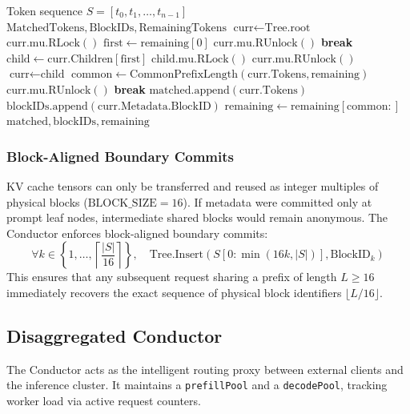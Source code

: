 \documentclass[10pt,twocolumn,letterpaper]{article}
\begin{document}
\begin{algorithm}[t]
\caption{Lock-Coupled MatchPrefix}
\label{alg:lock_coupling}
\begin{algorithmic}[1]
\Require Token sequence $S = [t_0, t_1, \dots, t_{n-1}]$
\Ensure $\text{MatchedTokens}, \text{BlockIDs}, \text{RemainingTokens}$
\State $\text{curr} \gets \text{Tree.root}$
\State $\text{curr.mu.RLock}()$
    \State $\text{first} \gets \text{remaining}[0]$
        \State $\text{curr.mu.RUnlock}()$
        \State \textbf{break}
    \EndIf
    \State $\text{child} \gets \text{curr.Children}[\text{first}]$
    \State $\text{child.mu.RLock}()$ 
    \State $\text{curr.mu.RUnlock}()$ 
    \State $\text{curr} \gets \text{child}$
    \State $\text{common} \gets \text{CommonPrefixLength}(\text{curr.Tokens}, \text{remaining})$
        \State $\text{curr.mu.RUnlock}()$
        \State \textbf{break}
    \EndIf
    \State $\text{matched.append}(\text{curr.Tokens})$
        \State $\text{blockIDs.append}(\text{curr.Metadata.BlockID})$
    \EndIf
    \State $\text{remaining} \gets \text{remaining}[\text{common}:]$
\EndWhile
\State \Return $\text{matched}, \text{blockIDs}, \text{remaining}$
\end{algorithmic}
\end{algorithm}

\subsubsection{Block-Aligned Boundary Commits}
KV cache tensors can only be transferred and reused as integer multiples of physical blocks ($\text{BLOCK\_SIZE} = 16$). If metadata were committed only at prompt leaf nodes, intermediate shared blocks would remain anonymous. The Conductor enforces block-aligned boundary commits:
\begin{equation}
\forall k \in \left\{1, \dots, \left\lceil \frac{|S|}{16} \right\rceil \right\}, \quad \text{Tree.Insert}(S[0 : \min(16k, |S|)], \text{BlockID}_k)
\end{equation}
This ensures that any subsequent request sharing a prefix of length $L \ge 16$ immediately recovers the exact sequence of physical block identifiers $\lfloor L / 16 \rfloor$.

\subsection{Disaggregated Conductor}
The Conductor acts as the intelligent routing proxy between external clients and the inference cluster. It maintains a \texttt{prefillPool} and a \texttt{decodePool}, tracking worker load via active request counters.
\end{document}
